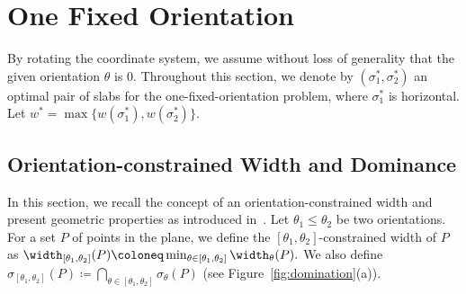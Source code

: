     
    
    
    


\section{One Fixed Orientation}
\label{sec:one_fixed}




By rotating the coordinate system, we assume without loss of generality that the given orientation $\theta$ is $0$. 
Throughout this section, we denote by $(\sigma_1^*, \sigma_2^*)$ an optimal pair of slabs for the one-fixed-orientation problem, where $\sigma_1^*$ is horizontal. Let $w^* = \max \{w(\sigma_1^*), w(\sigma_2^*) \}$.



\subsection{Orientation-constrained Width and Dominance}
\label{sec:one_fixed_properties}
In this section, we recall the concept of an orientation-constrained width and present geometric properties as introduced in~\cite{ahn2024constrained}.
Let $\theta_1\le \theta_2$ be two orientations. 
For a set $P$ of points in the plane, we define the $[\theta_1, \theta_2]$-constrained width of $P$ as $\width_{[\theta_1, \theta_2]}(P) \coloneq \min_{\theta \in [\theta_1, \theta_2]} \width_\theta (P).$ 
We also define $\sigma_{[\theta_1, \theta_2]}(P) \coloneq \bigcap_{\theta \in [\theta_1, \theta_2]} \sigma_\theta (P)$ (see Figure~\ref{fig:domination}(a)).
        

